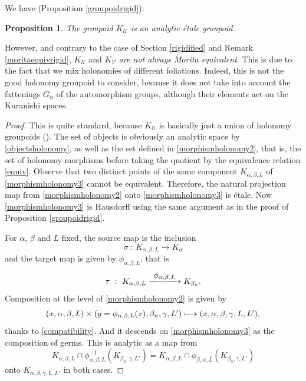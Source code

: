 \documentclass[10pt]{amsart}
\let\mathcal\mathscr
\def\mto{\mathchoice{\longmapsto}{\mapsto}{\mapsto}{\mapsto}}
\def\To#1{\mathchoice{\xrightarrow{\textstyle\kern4pt#1\kern3pt}}{\stackrel{#1}{\longrightarrow}}{}{}}
\theoremstyle{plain}
\newtheorem{proposition}[theorem]{Proposition}
\theoremstyle{definition}
\theoremstyle{remark}
\numberwithin{equation}{section}
\begin{document}
We have (\cf Proposition \ref{groupoidrigid}):
\begin{proposition}
\label{groupoidII}
The groupoid $K_{\mathcal U}$ is an analytic étale groupoid.
\end{proposition}
However, and contrary to the case of Section \ref{rigidified} and Remark \ref{moritaequivrigid}, $K_{\mathcal U}$ and $K_{\mathcal V}$ \emph{are not always Morita equivalent}. This is due to the fact that we mix holonomies of different foliations. Indeed, this is not the good holonomy groupoid to consider, because it does not take into account the fattenings $G_\alpha$ of the automorphism groups, although their elements act on the Kuranishi spaces.
\begin{proof}
This is quite standard, because $K_{\mathcal U}$ is basically just a union of holonomy groupoids (\cf \cite{Ha}).
The set of objects is obviously an analytic space by \eqref{objectsholonomy}, as well as the set defined in \eqref{morphismholonomy2}, that is, the set of holonomy morphisms before taking the quotient by the equivalence relation \eqref{equiv}. Observe that two distinct points of the same component $K_{\alpha,\beta, L}$ of \eqref{morphismholonomy3} cannot be equivalent. Therefore, the natural projection
map from \eqref{morphismholonomy2} onto \eqref{morphismholonomy3} is étale. Now \eqref{morphismholonomy3} is Hausdorff using the same argument as in the proof of Proposition \ref{groupoidrigid}.

For $\alpha$, $\beta$ and $L$ fixed, the source map is the inclusion
\begin{equation}
\label{sourceholonomy}
\sigma\ :\ K_{\alpha,\beta,L}\longrightarrow K_{\alpha}
\end{equation}
and the target map is given by $\phi_{\alpha,\beta, L}$, that is
\begin{equation}
\label{targetholonomy}
\tau \ :\ K_{\alpha,\beta, L}\To{\phi_{\alpha,\beta, L}}K_{\beta_n}.
\end{equation}
Composition at the level of \eqref{morphismholonomy2} is given by
\begin{equation}
\label{compholonomy}
(x,\alpha,\beta, L)\times (y=\phi_{\alpha,\beta,L}(x), \beta_n,\gamma, L')\mto (x, \alpha,\beta,\gamma, L, L'),
\end{equation}
thanks to \eqref{compatibility}. And it descends on \eqref{morphismholonomy3} as the composition of germs. This is analytic as a map from
\begin{equation}
\label{companaholonomy}
K_{\alpha,\beta,L}\cap \phi_{\alpha,\beta, L}^{-1} (K_{\beta_n, \gamma, L'})=K_{\alpha,\beta,L}\cap \phi_{\bar\beta, \alpha, \bar L} (K_{\beta_n, \gamma, L'})
\end{equation}
onto $K_{\alpha,\beta,\gamma, L, L'}$ in both cases.
\end{proof}
\end{document}
